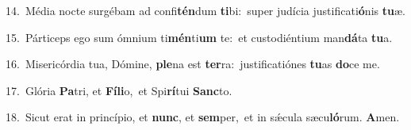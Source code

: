 {\numbfont\textcolor{\numbcolor}{14.}}~Média nocte surgébam ad confi\-\textbf{tén}\-dum \textbf{ti}\-bi:~\star super judícia justificati\-\textbf{ó}\-nis \textbf{tu}\-æ.\par
{\numbfont\textcolor{\numbcolor}{15.}}~Párticeps ego sum ómnium ti\-\textbf{mén}\-ti\textbf{um} te:~\star et custodiéntium man\-\textbf{dá}\-ta \textbf{tu}\-a.\par
{\numbfont\textcolor{\numbcolor}{16.}}~Misericórdia tua, Dómine, \textbf{ple}\-na est \textbf{ter}\-ra:~\star justificatiónes \textbf{tu}\-as \textbf{do}\-ce me.\par
{\numbfont\textcolor{\numbcolor}{17.}}~Glória \textbf{Pa}\-tri, et \textbf{Fí}\-\textbf{li}o,~\star et Spi\-\textbf{rí}\-tui \textbf{Sanc}\-to.\par
{\numbfont\textcolor{\numbcolor}{18.}}~Sicut erat in princípio, et \textbf{nunc}\-, et \textbf{sem}\-per,~\star et in sǽcula sæcu\-\textbf{ló}\-rum. \textbf{A}\-men.\par
